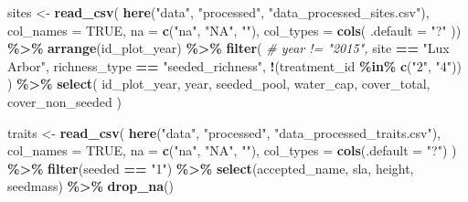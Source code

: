 \documentclass[
]{article}
\newenvironment{Shaded}{\begin{snugshade}}{\end{snugshade}}
\newcommand{\AttributeTok}[1]{\textcolor[rgb]{0.13,0.29,0.53}{#1}}
\newcommand{\CommentTok}[1]{\textcolor[rgb]{0.56,0.35,0.01}{\textit{#1}}}
\newcommand{\ConstantTok}[1]{\textcolor[rgb]{0.56,0.35,0.01}{#1}}
\newcommand{\FunctionTok}[1]{\textcolor[rgb]{0.13,0.29,0.53}{\textbf{#1}}}
\newcommand{\NormalTok}[1]{#1}
\newcommand{\OtherTok}[1]{\textcolor[rgb]{0.56,0.35,0.01}{#1}}
\newcommand{\SpecialCharTok}[1]{\textcolor[rgb]{0.81,0.36,0.00}{\textbf{#1}}}
\newcommand{\StringTok}[1]{\textcolor[rgb]{0.31,0.60,0.02}{#1}}
\begin{document}
\begin{Shaded}
\begin{Highlighting}[]
\NormalTok{sites }\OtherTok{\textless{}{-}} \FunctionTok{read\_csv}\NormalTok{(}
  \FunctionTok{here}\NormalTok{(}\StringTok{"data"}\NormalTok{, }\StringTok{"processed"}\NormalTok{, }\StringTok{"data\_processed\_sites.csv"}\NormalTok{),}
  \AttributeTok{col\_names =} \ConstantTok{TRUE}\NormalTok{, }\AttributeTok{na =} \FunctionTok{c}\NormalTok{(}\StringTok{"na"}\NormalTok{, }\StringTok{"NA"}\NormalTok{, }\StringTok{""}\NormalTok{), }\AttributeTok{col\_types =}
    \FunctionTok{cols}\NormalTok{(}
    \AttributeTok{.default =} \StringTok{"?"}
\NormalTok{  )) }\SpecialCharTok{\%\textgreater{}\%} 
  \FunctionTok{arrange}\NormalTok{(id\_plot\_year) }\SpecialCharTok{\%\textgreater{}\%}
  \FunctionTok{filter}\NormalTok{(}
    \CommentTok{\# year != "2015",}
\NormalTok{    site }\SpecialCharTok{==} \StringTok{"Lux Arbor"}\NormalTok{,}
\NormalTok{    richness\_type }\SpecialCharTok{==} \StringTok{"seeded\_richness"}\NormalTok{,}
    \SpecialCharTok{!}\NormalTok{(treatment\_id }\SpecialCharTok{\%in\%} \FunctionTok{c}\NormalTok{(}\StringTok{"2"}\NormalTok{, }\StringTok{"4"}\NormalTok{))}
\NormalTok{  ) }\SpecialCharTok{\%\textgreater{}\%}
  \FunctionTok{select}\NormalTok{(}
\NormalTok{    id\_plot\_year, year, seeded\_pool, water\_cap, cover\_total,}
\NormalTok{    cover\_non\_seeded}
\NormalTok{    )}

\NormalTok{traits }\OtherTok{\textless{}{-}} \FunctionTok{read\_csv}\NormalTok{(}
  \FunctionTok{here}\NormalTok{(}\StringTok{"data"}\NormalTok{, }\StringTok{"processed"}\NormalTok{, }\StringTok{"data\_processed\_traits.csv"}\NormalTok{),}
  \AttributeTok{col\_names =} \ConstantTok{TRUE}\NormalTok{, }\AttributeTok{na =} \FunctionTok{c}\NormalTok{(}\StringTok{"na"}\NormalTok{, }\StringTok{"NA"}\NormalTok{, }\StringTok{""}\NormalTok{), }\AttributeTok{col\_types =} \FunctionTok{cols}\NormalTok{(}\AttributeTok{.default =} \StringTok{"?"}\NormalTok{)}
\NormalTok{  ) }\SpecialCharTok{\%\textgreater{}\%}
  \FunctionTok{filter}\NormalTok{(seeded }\SpecialCharTok{==} \StringTok{"1"}\NormalTok{) }\SpecialCharTok{\%\textgreater{}\%}
  \FunctionTok{select}\NormalTok{(accepted\_name, sla, height, seedmass) }\SpecialCharTok{\%\textgreater{}\%}
  \FunctionTok{drop\_na}\NormalTok{()}


\end{Highlighting}
\end{Shaded}
\end{document}
